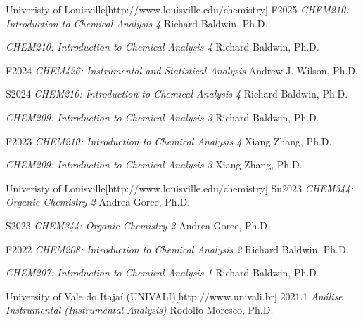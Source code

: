 \documentclass[10pt, twoside, table]{article} %
\begin{document}
\begin{timeline}{Univeristy of Louisville}[http://www.louisville.edu/chemistry]
    \entry
        {F2025}
        {\textit{CHEM210: Introduction to Chemical Analysis 4}}
        {Richard Baldwin, Ph.D.}

    \entry
        {}
        {\textit{CHEM210: Introduction to Chemical Analysis 4}}
        {Richard Baldwin, Ph.D.}

    \entry
        {F2024}
        {\textit{CHEM426: Instrumental and Statistical Analysis}}
        {Andrew J. Wilson, Ph.D.}

    \entry
        {S2024}
        {\textit{CHEM210: Introduction to Chemical Analysis 4}}
        {Richard Baldwin, Ph.D.}

    \entry
        {}
        {\textit{CHEM209: Introduction to Chemical Analysis 3}}
        {Richard Baldwin, Ph.D.}

    \entry
        {F2023}
        {\textit{CHEM210: Introduction to Chemical Analysis 4}}
        {Xiang Zhang, Ph.D.}

    \entry
        {}
        {\textit{CHEM209: Introduction to Chemical Analysis 3}}
        {Xiang Zhang, Ph.D.}
\end{timeline}

\begin{timeline}{Univeristy of Louisville}[http://www.louisville.edu/chemistry]
    \entry
        {Su2023}
        {\textit{CHEM344: Organic Chemistry 2}}
        {Andrea Gorce, Ph.D.}

    \entry
        {S2023}
        {\textit{CHEM344: Organic Chemistry 2}}
        {Andrea Gorce, Ph.D.}

    \entry
        {F2022}
        {\textit{CHEM208: Introduction to Chemical Analysis 2}}
        {Richard Baldwin, Ph.D.}

    \entry
        {}
        {\textit{CHEM207: Introduction to Chemical Analysis 1}}
        {Richard Baldwin, Ph.D.}
\end{timeline}

\vspace{\baselineskip}

\begin{timeline}{University of Vale do Itajaí (UNIVALI)}[http://www.univali.br]
    \entry
        {2021.1}
        {\textit{Análise Instrumental (Instrumental Analysis)}}
        {Rodolfo Moresco, Ph.D.}
\end{timeline}

\end{document}
